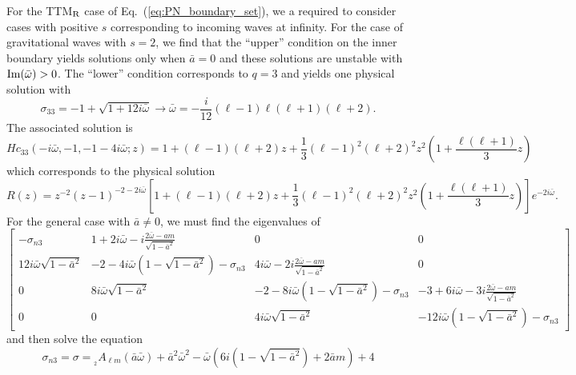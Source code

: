\documentclass[11pt]{article}
\newcommand{\scA}[4][]{{}_{{}_{#2}}A^{#1}_{#3}(#4)}
\begin{document}
For the TTM${}_{\rm R}$ case of Eq.~(\ref{eq:PN_boundary_set}), we a
required to consider cases with positive $s$ corresponding to incoming
waves at infinity.  For the case of gravitational waves with $s=2$, we
find that the ``upper'' condition on the inner boundary yields
solutions only when $\bar{a}=0$ and these solutions are unstable with
$\rm{Im}(\bar\omega)>0$.  The ``lower'' condition corresponds to
  $q=3$ and yields one physical solution with
\begin{equation}
  \sigma_{33}=-1+\sqrt{1+12i\bar\omega} \to
  \bar\omega=-\frac{i}{12}(\ell-1)\ell(\ell+1)(\ell+2).
\end{equation}
The associated solution is
\begin{equation}
  Hc_{33}(-i\bar\omega,-1,-1-4i\bar\omega;z)=
  1 + (\ell-1)(\ell+2)z + \frac13(\ell-1)^2(\ell+2)^2z^2\left(
  1 + \frac{\ell(\ell+1)}3 z\right)
\end{equation}
which corresponds to the physical solution
\begin{equation}
R(z)=z^{-2}(z-1)^{-2-2i\bar\omega}\left[
  1 + (\ell-1)(\ell+2)z + \frac13(\ell-1)^2(\ell+2)^2z^2\left(
  1 + \frac{\ell(\ell+1)}3 z\right)\right]e^{-2i\bar\omega}.
\end{equation}
For the general case with $\bar{a}\ne0$, we must find the eigenvalues of
\begin{equation}\label{eq:gen_poly_matrix2}
  \left[\begin{array}{cccc}
    -\sigma_{n3} & 
    1+2i\bar\omega-i\frac{2\bar\omega-am}{\sqrt{1-\bar{a}^2}} &
    0 & 0 \\
    12i\bar\omega\sqrt{1-\bar{a}^2} &
    -2 - 4i\bar\omega\left(1-\sqrt{1-\bar{a}^2}\right) - \sigma_{n3} &
    4i\bar\omega - 2i\frac{2\bar\omega-am}{\sqrt{1-\bar{a}^2}} &
    0 \\
    0 & 8i\bar\omega\sqrt{1-\bar{a}^2} &
    -2 - 8i\bar\omega\left(1-\sqrt{1-\bar{a}^2}\right) - \sigma_{n3} &
    -3 + 6i\bar\omega - 3i\frac{2\bar\omega-am}{\sqrt{1-\bar{a}^2}} \\
    0 & 0 & 4i\bar\omega\sqrt{1-\bar{a}^2} &
    -12i\bar\omega\left(1-\sqrt{1-\bar{a}^2}\right) - \sigma_{n3}
  \end{array}\right]
\end{equation}
and then solve the equation
\begin{equation}\label{eq:gen_sigma_val2}
  \sigma_{n3}=\sigma = \scA{2}{\ell{m}}{\bar{a}\bar\omega} 
    + \bar{a}^2\bar\omega^2 - \bar\omega\left(
       6i\left(1-\sqrt{1-\bar{a}^2}\right) + 2\bar{a}m\right)+4
\end{equation}
\end{document}
